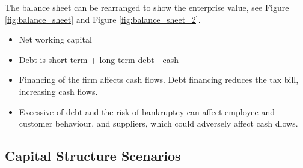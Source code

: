 The balance sheet can be rearranged to show the enterprise value, see Figure \ref{fig:balance_sheet} and Figure \ref{fig:balance_sheet_2}. 

\begin{itemize}
    \item Net working capital
    \item Debt is short-term + long-term debt - cash
    \item Financing of the firm affects cash flows. Debt financing reduces the tax bill, increasing cash flows.
    \item Excessive of debt and the risk of bankruptcy can affect employee and customer behaviour, and suppliers, which could adversely affect cash dlows. 
\end{itemize}

\subsection*{Capital Structure Scenarios}


